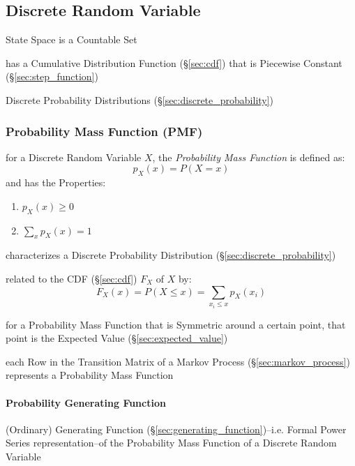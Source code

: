 \subsection{Discrete Random Variable}\label{sec:discrete_random_variable}

State Space is a Countable Set

has a Cumulative Distribution Function (\S\ref{sec:cdf}) that is Piecewise
Constant (\S\ref{sec:step_function})

\fist Discrete Probability Distributions (\S\ref{sec:discrete_probability})



\subsubsection{Probability Mass Function (PMF)}\label{sec:pmf}

for a Discrete Random Variable $X$, the \emph{Probability Mass Function} is
defined as:
\[
  p_X(x) = P(X = x)
\]
and has the Properties:
\begin{enumerate}
  \item $p_X(x) \geq 0$
  \item $\sum_x p_X(x) = 1$
\end{enumerate}

characterizes a Discrete Probability Distribution
(\S\ref{sec:discrete_probability})

related to the CDF (\S\ref{sec:cdf}) $F_X$ of $X$ by:
\[
  F_X(x) = P(X \leq x) = \sum_{x_i \leq x} p_X(x_i)
\]

for a Probability Mass Function that is Symmetric around a certain point, that
point is the Expected Value (\S\ref{sec:expected_value})

\fist each Row in the Transition Matrix of a Markov Process
(\S\ref{sec:markov_process}) represents a Probability Mass Function



\paragraph{Probability Generating Function}
\label{sec:probability_generating_function}\hfill

(Ordinary) Generating Function (\S\ref{sec:generating_function})--i.e. Formal
Power Series representation--of the Probability Mass Function of a Discrete
Random Variable



